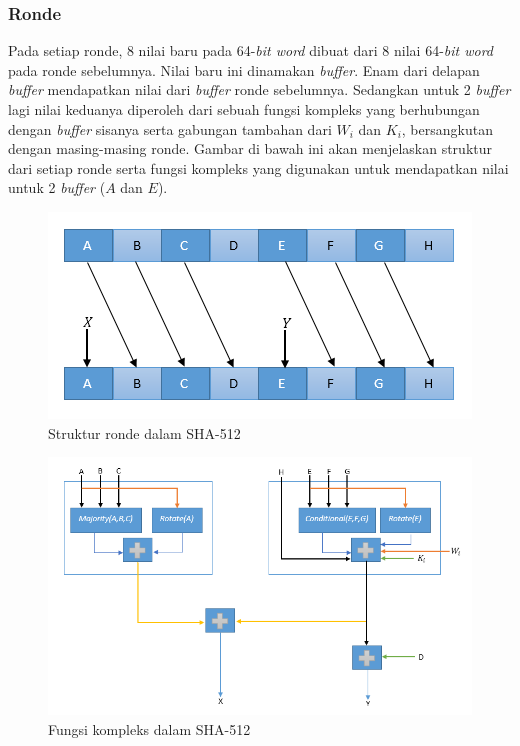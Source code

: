 \subsubsection{Ronde}
\label{sssec:rondesha512}
Pada setiap ronde, 8 nilai baru pada 64-\textit{bit word} dibuat dari 8 nilai 64-\textit{bit word} pada ronde sebelumnya. Nilai baru ini dinamakan \textit{buffer}. Enam dari delapan \textit{buffer} mendapatkan nilai dari \textit{buffer} ronde sebelumnya. Sedangkan untuk 2 \textit{buffer} lagi nilai keduanya diperoleh dari sebuah fungsi kompleks yang berhubungan dengan \textit{buffer} sisanya serta gabungan tambahan dari \begin{math}W_i\end{math} dan \begin{math}K_i\end{math}, bersangkutan dengan masing-masing ronde. Gambar di bawah ini akan menjelaskan struktur dari setiap ronde serta fungsi kompleks yang digunakan untuk mendapatkan nilai untuk 2 \textit{buffer} (\begin{math}A\end{math} dan \begin{math}E\end{math}).

\begin{figure}[ht]
	\includegraphics[scale=0.8]{Gambar/sha_round}
	\centering
	\caption{Struktur ronde dalam SHA-512}
\end{figure}

\begin{figure}[ht]
	\includegraphics[scale=0.7]{Gambar/complex_function}
	\centering
	\caption{Fungsi kompleks dalam SHA-512}
\end{figure}

